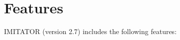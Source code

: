 \documentclass[a4paper,11pt]{report}
\newcommand{\hytech}{{\sc HyTech}}
\newcommand{\imitator}{\textsf{IMITATOR}}
\newcommand{\imitatorversion}{2.7}
\begin{document}
% 
% 
% 

	


\section{Features} \label{ss:features}

\imitator{} (version \imitatorversion{}) includes the following features:
\end{document}
